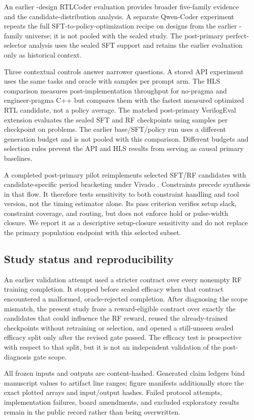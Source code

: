 An earlier -design RTLCoder evaluation provides broader
five-family evidence and the candidate-distribution analysis.  A separate
Qwen-Coder experiment~\cite{hui2024qwen25coder} repeats the full
SFT-to-policy-optimization recipe on
 designs from the earlier
-family universe; it is not pooled with the sealed
study.  The post-primary perfect-selector analysis uses the sealed SFT support
and retains the earlier evaluation only as historical context.

Three contextual controls answer narrower questions.  A stored API experiment
uses the same tasks and oracle with  samples
per prompt arm.  The HLS comparison measures post-implementation throughput
for no-pragma and engineer-pragma C++ but compares them with the fastest
measured optimized RTL candidate, not a policy average.  The matched post-primary
VerilogEval extension evaluates the sealed SFT and RF checkpoints using
 samples per checkpoint on
 problems.  The earlier base/SFT/policy run uses
a different generation budget and is not pooled with this comparison.
Different budgets and selection rules
prevent the API and HLS results from serving as causal primary baselines.

A completed post-primary pilot reimplements
 selected SFT/RF candidates with
candidate-specific period bracketing under Vivado
.  Constraints precede synthesis in that flow.
It therefore tests sensitivity to both constraint handling and tool version,
not the timing estimator alone.  Its pass criterion verifies setup slack,
constraint coverage, and routing, but does not enforce hold or pulse-width
closure.  We report it as a descriptive setup-closure sensitivity and do not
replace the primary population endpoint with this selected subset.

\subsection{Study status and reproducibility}

An earlier validation attempt used a stricter contract over every nonempty RF
training completion.  It stopped before sealed efficacy when that contract
encountered a malformed, oracle-rejected completion.  After diagnosing the
scope mismatch, the present study froze a reward-eligible contract over exactly
the candidates that could influence the RF reward, reused the already-trained
checkpoints without retraining or selection, and opened a still-unseen sealed
efficacy split only after the revised gate passed.  The efficacy test is
prospective with respect to that split, but it is not an independent validation
of the post-diagnosis gate scope.

All frozen inputs and outputs are content-hashed.  Generated claim ledgers bind
manuscript values to artifact line ranges; figure manifests additionally store
the exact plotted arrays and input/output hashes.  Failed protocol attempts,
implementation failures, board amendments, and excluded exploratory results
remain in the public record rather than being overwritten.
